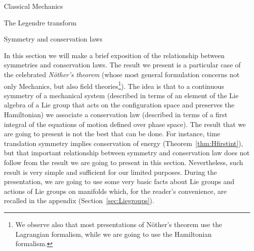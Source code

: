 \documentclass[oneside,a4paper,11pt]{amsbook}
\theoremstyle{remark}\newtheorem{exercise}{Exercise}[chapter]
\theoremstyle{plain}\newtheorem{teo}{Theorem}[section]
\theoremstyle{plain}\newtheorem{lem}[teo]{Lemma}
\theoremstyle{plain}\newtheorem{prop}[teo]{Proposition}
\theoremstyle{plain}\newtheorem{cor}[teo]{Corollary}
\theoremstyle{definition}\newtheorem{defin}[teo]{Definition}
\theoremstyle{remark}\newtheorem{rem}[teo]{Remark}
\theoremstyle{definition}\newtheorem{notation}[teo]{Notation}
\theoremstyle{definition}\newtheorem{convention}[teo]{Convention}
\theoremstyle{definition}\newtheorem{example}[teo]{Example}
\numberwithin{section}{chapter}
\numberwithin{equation}{section}
\begin{document}
\begin{chapter}{Classical Mechanics}
\begin{section}{The Legendre transform}
\end{section}

\begin{section}{Symmetry and conservation laws}
\label{sec:Nother}

In this section we will make a brief exposition of the relationship between symmetries and conservation laws. The result we present is a particular
case of the celebrated {\em N\"other's theorem\/} (whose most general formulation concerns not only Mechanics, but also field theories\footnote{%
We observe also that most presentations of N\"other's theorem use the Lagrangian formalism, while we are going to use the Hamiltonian formalism.}).
The idea is that to a continuous symmetry of
a mechanical system (described in terms of an element of the Lie algebra of a Lie group that acts on the configuration space and preserves the Hamiltonian)
we associate a conservation law (described in terms of a first integral of the equations
of motion defined over phase space).
The result that we are going to present is not the best that can be done. For instance, time translation
symmetry implies conservation of energy (Theorem~\ref{thm:Hfirstint}), but that important relationship between symmetry and conservation law does
not follow from the result we are going to present in this section. Nevertheless, such result is very simple and sufficient
for our limited purposes. During the presentation, we are going to use some very basic facts about Lie groups and actions of Lie groups on manifolds which, for the reader's
convenience, are recalled in the appendix (Section~\ref{sec:Liegroups}).

\medskip


\end{section}
\end{chapter}
\end{document}
